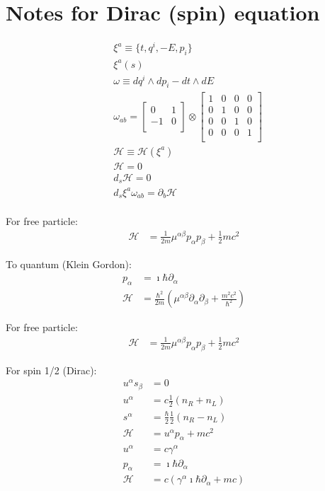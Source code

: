 \documentclass[aps,pra,10pt,twocolumn,floatfix,nofootinbib]{revtex4-1}
\theoremstyle{definition}
\begin{document}
\section{Notes for Dirac (spin) equation}
\begin{align*}
&\xi^a\equiv\{t, q^i, -E, p_i\} \\
&\xi^a(s)\\
&\omega \equiv  dq^i \wedge dp_i - dt \wedge dE \\
&\omega_{ab} =  \left[
\begin{array}{cc}
	0 & 1 \\
	-1 & 0 \\
\end{array}
\right] \otimes \left[
\begin{array}{cccc}
	1 & 0 & 0 & 0\\
	0 & 1 & 0 & 0\\
	0 & 0 & 1 & 0 \\
	0 & 0 & 0 & 1 \\
\end{array}
\right] \\
&\mathcal{H}\equiv\mathcal{H}(\xi^a) \\
&\mathcal{H} = 0 \\
&d_s \mathcal{H} = 0 \\
&d_s\xi^a\omega_{a b} = \partial_b\mathcal{H}  \\
\end{align*}

For free particle:
\begin{align*}
\mathcal{H} &= \frac{1}{2m} \mu^{\alpha\beta} p_\alpha p_\beta + \frac{1}{2} mc^2
\end{align*}

To quantum (Klein Gordon):
\begin{align*}
p_\alpha &= \imath \hbar \partial_\alpha \\
\mathcal{H} &= \frac{\hbar^2}{2m} (\mu^{\alpha\beta} \partial_\alpha \partial_\beta + \frac{m^2c^2}{\hbar^2} )
\end{align*}

For free particle:
\begin{align*}
\mathcal{H} &= \frac{1}{2m} \mu^{\alpha\beta} p_\alpha p_\beta + \frac{1}{2} mc^2
\end{align*}

For spin 1/2 (Dirac):
\begin{align*}
u^\alpha s_\beta &= 0 \\
u^\alpha &= c \frac{1}{2} (n_R + n_L) \\
s^\alpha &= \frac{\hbar}{2} \frac{1}{2} (n_R - n_L) \\
\mathcal{H} &= u^\alpha p_\alpha + mc^2 \\
u^\alpha &= c \gamma^\alpha \\
p_\alpha &= \imath \hbar \partial_\alpha \\
\mathcal{H} &= c (\gamma^\alpha \imath \hbar \partial_\alpha + mc)
\end{align*}
\end{document}
